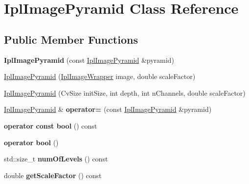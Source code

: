 \hypertarget{class_ipl_image_pyramid}{
\section{IplImagePyramid Class Reference}
\label{class_ipl_image_pyramid}
}
\subsection*{Public Member Functions}
\begin{DoxyCompactItemize}
\item 
\hypertarget{class_ipl_image_pyramid_a14dd8c56c07c98f7714dcb5e76aaeb72}{
{\bfseries IplImagePyramid} (const \hyperlink{class_ipl_image_pyramid}{IplImagePyramid} \&pyramid)}
\label{class_ipl_image_pyramid_a14dd8c56c07c98f7714dcb5e76aaeb72}

\item 
\hyperlink{class_ipl_image_pyramid_a6d41d348cdfaea6e4444b1fdd523f555}{IplImagePyramid} (\hyperlink{class_ipl_image_wrapper}{IplImageWrapper} image, double scaleFactor)
\item 
\hyperlink{class_ipl_image_pyramid_a817d4a60ac96b844a97df0fa1bc52a5e}{IplImagePyramid} (CvSize initSize, int depth, int nChannels, double scaleFactor)
\item 
\hypertarget{class_ipl_image_pyramid_a9a35f62c0e2a6442ffe33dff407a77a0}{
\hyperlink{class_ipl_image_pyramid}{IplImagePyramid} \& {\bfseries operator=} (const \hyperlink{class_ipl_image_pyramid}{IplImagePyramid} \&pyramid)}
\label{class_ipl_image_pyramid_a9a35f62c0e2a6442ffe33dff407a77a0}

\item 
\hypertarget{class_ipl_image_pyramid_a3208ef615be469259755968496df11ea}{
{\bfseries operator const bool} () const }
\label{class_ipl_image_pyramid_a3208ef615be469259755968496df11ea}

\item 
\hypertarget{class_ipl_image_pyramid_a9759305c20611d150f35fed4df4b804e}{
{\bfseries operator bool} ()}
\label{class_ipl_image_pyramid_a9759305c20611d150f35fed4df4b804e}

\item 
\hypertarget{class_ipl_image_pyramid_aed09f40471c9cf123c9d5dfe7f0d6bd1}{
std::size\_\-t {\bfseries numOfLevels} () const }
\label{class_ipl_image_pyramid_aed09f40471c9cf123c9d5dfe7f0d6bd1}

\item 
\hypertarget{class_ipl_image_pyramid_ae74c2b5c82245556498dfd2d8be999d5}{
double {\bfseries getScaleFactor} () const }
\label{class_ipl_image_pyramid_ae74c2b5c82245556498dfd2d8be999d5}


\end{DoxyCompactItemize}
